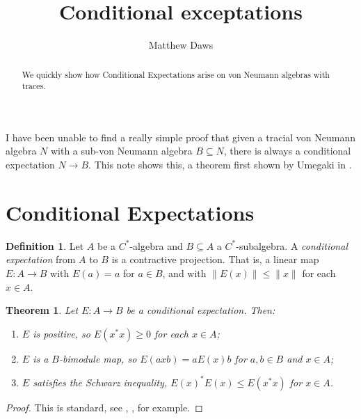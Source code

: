 \documentclass[a4paper,11pt]{article}
\newtheorem{theorem}[lemma]{Theorem}
\theoremstyle{definition}
\newtheorem{definition}[lemma]{Definition}
\begin{document}
\title{Conditional exceptations}
\author{Matthew Daws}
\maketitle

\begin{abstract}
We quickly show how Conditional Expectations arise on von Neumann algebras with traces.
\end{abstract}

I have been unable to find a really simple proof that given a tracial von Neumann algebra $N$ with a sub-von Neumann algebra $B\subseteq N$, there is always a conditional expectation $N\to B$.  This note shows this, a theorem first shown by Umegaki in \cite{Umegaki_CondExp2}.


\section{Conditional Expectations}

\begin{definition}
Let $A$ be a $C^*$-algebra and $B\subseteq A$ a $C^*$-subalgebra.  A \emph{conditional expectation} from $A$ to $B$ is a contractive projection.  That is, a linear map $E\colon A \to B$ with $E(a)=a$ for $a\in B$, and with $\|E(x)\| \leq \|x\|$ for each $x\in A$.
\end{definition}

\begin{theorem}
Let $E \colon A \to B$ be a conditional expectation.  Then:
\begin{enumerate}
  \item $E$ is positive, so $E(x^*x)\geq 0$ for each $x\in A$;
  \item $E$ is a $B$-bimodule map, so $E(axb) = a E(x) b$ for $a,b\in B$ and $x\in A$;
  \item $E$ satisfies the Schwarz inequality, $E(x)^* E(x) \leq E(x^*x)$ for $x\in A$.
\end{enumerate}
\end{theorem}
\begin{proof}
This is standard, see \cite[Theorem~3.4, Chapter~III]{TakesakiI}, \cite[Theorem~1.5.10]{BrownOzawa}, \cite[Section~II.6.10]{Blackadar_OperatorAlgebrasBook} for example.
\end{proof}
\end{document}
